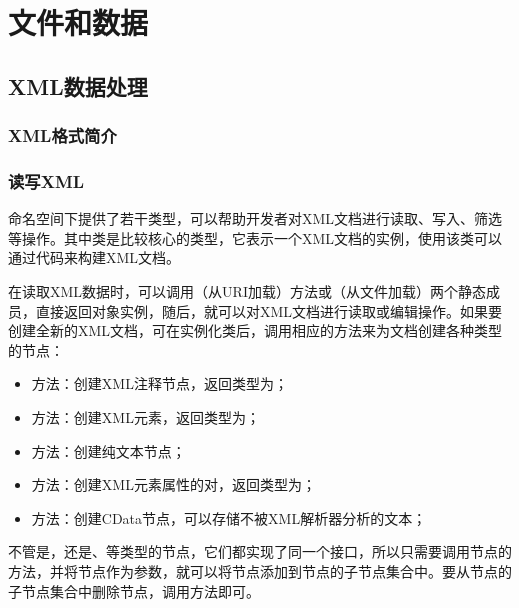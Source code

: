 \chapter{文件和数据}

\section{XML数据处理}

\subsection{XML格式简介}

\subsection{读写XML}

命名空间下提供了若干类型，可以帮助开发者对XML文档进行读取、写入、筛选等操作。其中类是比较核心的类型，它表示一个XML文档的实例，使用该类可以通过代码来构建XML文档。

在读取XML数据时，可以调用（从URI加载）方法或（从文件加载）两个静态成员，直接返回对象实例，随后，就可以对XML文档进行读取或编辑操作。如果要创建全新的XML文档，可在实例化类后，调用相应的方法来为文档创建各种类型的节点：

\begin{itemize}
	\item {}方法：创建XML注释节点，返回类型为；
	\item {}方法：创建XML元素，返回类型为；
	\item {}方法：创建纯文本节点；
	\item {}方法：创建XML元素属性的对，返回类型为；
	\item {}方法：创建CData节点，可以存储不被XML解析器分析的文本；
\end{itemize}

不管是，还是、等类型的节点，它们都实现了同一个接口，所以只需要调用节点的方法，并将节点作为参数，就可以将节点添加到节点的子节点集合中。要从节点的子节点集合中删除节点，调用方法即可。

